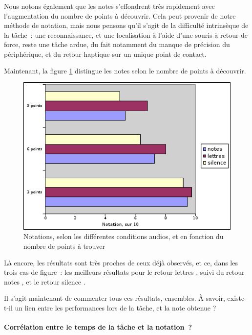 \documentclass[
]{book}
\begin{document}
Nous notons également que les notes s'effondrent très rapidement avec
l'augmentation du nombre de points à découvrir. Cela peut provenir de notre
méthode de notation, mais nous pensons qu'il s'agit de la difficulté
intrinsèque de la tâche~: une reconnaissance, et une localisation à l'aide
d'une souris à retour de force, reste une tâche ardue, du fait notamment du
manque de précision du périphérique, et du retour haptique sur un unique
point de contact.

Maintenant, la figure \ref{fig:notations3}
distingue les notes selon le nombre de points à découvrir.

\begin{figure}
\centering
\includegraphics{img/res_loc_notes_points.png}
\caption{\label{fig:notations3}Notations, selon les différentes
conditions audios, et en fonction du nombre de points à
trouver}
\end{figure}

Là encore, les résultats sont très proches de ceux déjà observés, et ce,
dans les trois cas de figure~: les meilleurs résultats pour le retour lettres
, suivi du retour notes , et le retour silence .

Il s'agit maintenant de commenter tous ces résultats, ensembles. À savoir,
existe-t-il un lien entre les performances lors de la tâche, et la note
obtenue ?

\hypertarget{corruxe9lation-entre-le-temps-de-la-tuxe2che-et-la-notation}{%
\paragraph{Corrélation entre le temps de la tâche et la notation~?}\label{corruxe9lation-entre-le-temps-de-la-tuxe2che-et-la-notation}}
\end{document}
